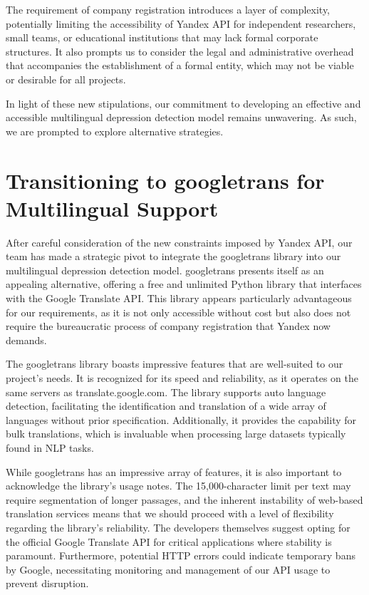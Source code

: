 The requirement of company registration introduces a layer of complexity, potentially limiting the accessibility of Yandex API for independent researchers, small teams, or educational institutions that may lack formal corporate structures. It also prompts us to consider the legal and administrative overhead that accompanies the establishment of a formal entity, which may not be viable or desirable for all projects.

In light of these new stipulations, our commitment to developing an effective and accessible multilingual depression detection model remains unwavering. As such, we are prompted to explore alternative strategies.

\section{Transitioning to googletrans for Multilingual Support}

\quad After careful consideration of the new constraints imposed by Yandex API, our team has made a strategic pivot to integrate the googletrans library \cite{googletranslib} into our multilingual depression detection model. googletrans presents itself as an appealing alternative, offering a free and unlimited Python library that interfaces with the Google Translate API. This library appears particularly advantageous for our requirements, as it is not only accessible without cost but also does not require the bureaucratic process of company registration that Yandex now demands.

The googletrans library \cite{googletranslib} boasts impressive features that are well-suited to our project's needs. It is recognized for its speed and reliability, as it operates on the same servers as translate.google.com. The library supports auto language detection, facilitating the identification and translation of a wide array of languages without prior specification. Additionally, it provides the capability for bulk translations, which is invaluable when processing large datasets typically found in NLP tasks.

While googletrans \cite{googletranslib} has an impressive array of features, it is also important to acknowledge the library’s usage notes. The 15,000-character limit per text may require segmentation of longer passages, and the inherent instability of web-based translation services means that we should proceed with a level of flexibility regarding the library's reliability. The developers themselves suggest opting for the official Google Translate API for critical applications where stability is paramount. Furthermore, potential HTTP errors could indicate temporary bans by Google, necessitating monitoring and management of our API usage to prevent disruption.


